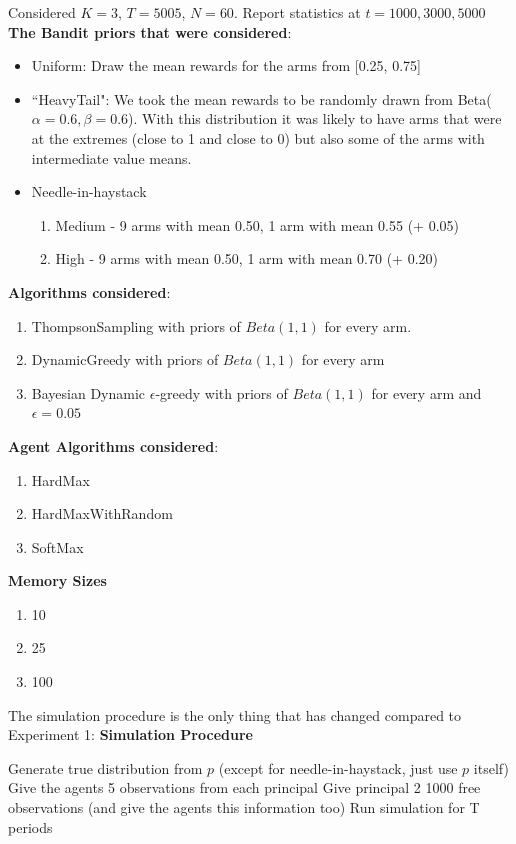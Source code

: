 \documentclass[11pt,letterpaper]{article}
\begin{document}
Considered $K = 3$, $T = 5005$, $N = 60$. Report statistics at $t = 1000, 3000, 5000$ \\
\textbf{The Bandit priors that were considered}:
\begin{itemize}
\item Uniform: Draw the mean rewards for the arms from [0.25, 0.75]
\item ``HeavyTail": We took the mean rewards to be randomly drawn from Beta($\alpha=0.6,\beta=0.6$). With this distribution it was likely to have arms that were at the extremes (close to 1 and close to 0) but also some of the arms with intermediate value means.
\item Needle-in-haystack
\begin{enumerate}
\item Medium - 9 arms with mean 0.50, 1 arm with mean 0.55 (+ 0.05)
\item High - 9 arms with mean 0.50, 1 arm with mean 0.70 (+ 0.20)
\end{enumerate}
\end{itemize}
\textbf{Algorithms considered}:
\begin{enumerate}
\item ThompsonSampling with priors of $Beta(1, 1)$ for every arm.
\item DynamicGreedy with priors of $Beta(1, 1)$ for every arm
\item Bayesian Dynamic $\epsilon$-greedy with priors of $Beta(1, 1)$ for every arm and $\epsilon=0.05$
\end{enumerate}
\textbf{Agent Algorithms considered}:
\begin{enumerate}
\item HardMax
\item HardMaxWithRandom
\item SoftMax
\end{enumerate}
\textbf{Memory Sizes}
\begin{enumerate}
\item 10
\item 25
\item 100
\end{enumerate}

The simulation procedure is the only thing that has changed compared to Experiment 1:
\textbf{Simulation Procedure}
\begin{algorithm}[H]
\begin{algorithmic}[1]
				\State Generate true distribution from $p$ (except for needle-in-haystack, just use $p$ itself)
				\State Give the agents 5 observations from each principal
				\State Give principal 2 1000 free observations (and give the agents this information too)
				\State Run simulation for T periods
			\EndFor
		\EndFor
	\EndFor
\EndFor
\end{algorithmic}
\end{algorithm}
\end{document}
